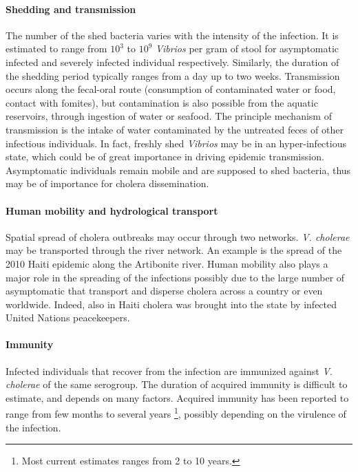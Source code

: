 \paragraph{Shedding and transmission} The number of the shed bacteria varies with the intensity of the infection. It is estimated to range from $10^3$ to $10^{9}$ \textit{Vibrios} per gram of stool for asymptomatic infected and severely infected individual respectively. Similarly, the duration of the shedding period typically ranges from a day up to two weeks.
Transmission occurs along the fecal-oral route (consumption of contaminated water or food, contact with fomites), but contamination is also possible from the aquatic reservoirs, through ingestion of water or seafood. The principle mechanism of transmission is the intake of water contaminated by the untreated feces of other infectious individuals. In fact, freshly shed \textit{Vibrios} may be in an hyper-infectious state, which could be of great importance in driving epidemic transmission\cite{Butler:CholeraStoolBacteria:2006}.
Asymptomatic individuals remain mobile and are supposed to shed bacteria, thus may be of importance for cholera dissemination.

\paragraph{Human mobility and hydrological transport} Spatial spread of cholera outbreaks may occur through two networks. \textit{V. cholerae} may be transported through the river network. An example is the spread of the 2010 Haiti epidemic along the Artibonite river\cite{Piarroux:UnderstandingCholeraEpidemic:2011}. Human mobility also plays a major role in the spreading of the infections possibly due to the large number of asymptomatic that transport and disperse cholera across a country or even worldwide.  Indeed, also in Haiti cholera was brought into the state by infected United Nations peacekeepers\cite{Piarroux:UnderstandingCholeraEpidemic:2011}. %

\paragraph{Immunity} Infected individuals that recover from the infection are immunized against \textit{V. cholerae}  of the same serogroup. The duration of acquired immunity is difficult to estimate, and depends on many factors. Acquired immunity has been reported to range from few months to several years \footnote{Most current estimates ranges from 2 to 10 years.}, possibly depending on the virulence of the infection\cite{Levine:DurationInfectionDerivedImmunity:1981,Kaper:Cholera:1995,Woodward:CholeraReinfectionMan:1971,Glass:SeroepidemiologicalStudiesEI:1985,Clemens:BiotypeDeterminantNatural:1991,Leung:ProtectionAffordedPrevious:2021}.

